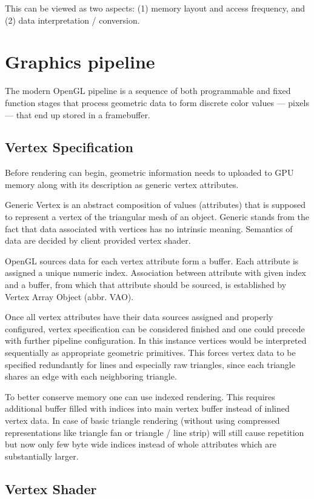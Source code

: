 This can be viewed as two aspects: (1) memory layout and access frequency, and (2) data interpretation / conversion.

\section{Graphics pipeline}
The modern OpenGL pipeline is a sequence of both programmable and fixed function stages that process geometric data to form discrete color values --- pixels --- that end up stored in a framebuffer. 

\subsection{Vertex Specification}

Before rendering can begin, geometric information needs to uploaded to GPU memory along with its description as generic vertex attributes.

Generic Vertex is an abstract composition of values (attributes) that is supposed to represent a vertex of the triangular mesh of an object.
Generic stands from the fact that data associated with vertices has no intrinsic meaning.
Semantics of data are decided by client provided vertex shader.

OpenGL sources data for each vertex attribute form a buffer. Each attribute is assigned a unique numeric index.
Association between attribute with given index and a buffer, from which that attribute should be sourced, is established by Vertex Array Object (abbr. VAO).

Once all vertex attributes have their data sources assigned and properly configured, vertex specification can be considered finished and one could precede with further pipeline configuration.
In this instance vertices would be interpreted sequentially as appropriate geometric primitives. This forces vertex data to be specified redundantly for 
lines and especially raw triangles, since each triangle shares an edge with each neighboring triangle.

To better conserve memory one can use indexed rendering. This requires additional buffer filled with indices into main vertex buffer instead of inlined vertex data.
In case of basic triangle rendering (without using compressed representations like triangle fan or triangle / line strip) will still cause repetition but now only few byte wide indices instead of whole attributes which are substantially larger.

\subsection{Vertex Shader}

